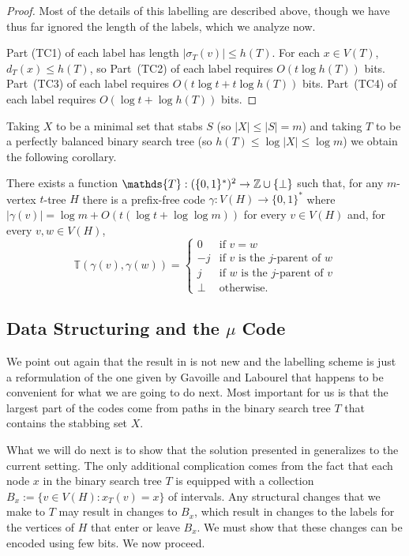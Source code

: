 \documentclass[kpfonts]{patmorin}
\begin{document}
\begin{proof}
  Most of the details of this labelling are described above, though we have thus far ignored the length of the labels, which we analyze now.
  
  Part (TC1) of each label has length $|\sigma_T(v)|\le h(T)$.  For each $x\in V(T)$, $d_T(x)\le h(T)$, so Part~(TC2) of each label requires $O(t\log h(T))$ bits.  Part~(TC3) of each label requires $O(t\log t + t\log h(T))$ bits.  Part~(TC4) of each label requires $O(\log t + \log h(T))$ bits.
\end{proof}

Taking $X$ to be a minimal set that stabs $S$ (so $|X|\le |S|=m$) and taking $T$ to be a perfectly balanced binary search tree (so $h(T)\le \log|X|\le\log m$) we obtain the following corollary.

\begin{cor}
  There exists a function $\mathds{T}:(\{0,1\}^*)^2\to \Z\cup\{\perp\}$ such that, for any $m$-vertex $t$-tree $H$ there is a prefix-free code $\gamma:V(H)\to\{0,1\}^*$ where $|\gamma(v)|=\log m + O(t(\log t + \log\log m))$ for every $v\in V(H)$ and, for every $v,w\in V(H)$, 
  \[
      \mathds{T}(\gamma(v),\gamma(w)) = \begin{cases}
      0 & \text{if $v=w$} \\
      -j & \text{if $v$ is the $j$-parent of $w$} \\
      j & \text{if $w$ is the $j$-parent of $v$} \\
      \perp & \text{otherwise.}
    \end{cases}
  \]
\end{cor}


\subsection{Data Structuring and the $\mu$ Code}

We point out again that the result in  is not new and the labelling scheme is just a reformulation of the one given by Gavoille and Labourel \cite{gavoille.labourel:shorter} that happens to be convenient for what we are going to do next. Most important for us is that the largest part of the codes come from paths in the binary search tree $T$ that contains the stabbing set $X$.  

What we will do next is to show that the solution presented in  generalizes to the current setting.  The only additional complication comes from the fact that each node $x$ in the binary search tree $T$ is equipped with a collection $B_x:=\{v\in V(H):x_T(v)=x\}$ of intervals.  Any structural changes that we make to $T$ may result in changes to $B_x$, which result in changes to the labels for the vertices of $H$ that enter or leave $B_x$.  We must show that these changes can be encoded using few bits.  We now proceed.
\end{document}
